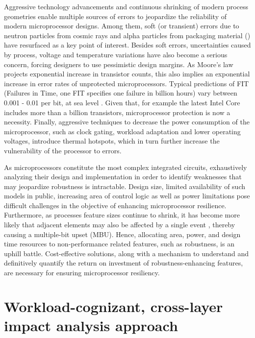 \documentclass[12pt]{yalephd}
\begin{document}
Aggressive technology advancements and continuous shrinking of modern process geometries enable multiple sources of errors to jeopardize the reliability of modern microprocessor designs. Among them, soft (or transient) errors due to neutron particles from cosmic rays and alpha particles from packaging material (\cite{normand1996single, constantinescu2003trends}) have resurfaced as a key point of interest. Besides soft errors, uncertainties caused by process, voltage and temperature variations have also become a serious concern, forcing designers to use pessimistic design margins. As Moore's law projects exponential increase in transistor counts, this also implies an exponential increase in error rates of unprotected microprocessors. Typical predictions of FIT (Failures in Time, one FIT specifies one failure in billion hours) vary between 0.001 - 0.01 per bit, at sea level \cite{normand1996single}. Given that, for example the latest Intel Core includes more than a billion transistors, microprocessor protection is now a necessity. Finally, aggressive techniques to decrease the power consumption of the microprocessor, such as clock gating, workload adaptation and lower operating voltages, introduce thermal hotspots, which in turn further increase the vulnerability of the processor to errors.

As microprocessors constitute the most complex integrated circuits, exhaustively analyzing their design and implementation in order to identify weaknesses that may jeopardize robustness is intractable. Design size, limited availability of such models in public, increasing area of control logic as well as power limitations pose difficult challenges in the objective of enhancing microprocessor resilience. Furthermore, as processes feature sizes continue to shrink, it has become more likely that adjacent elements may also be affected by a single event \cite{criswell1984single}, thereby causing a multiple-bit upset (MBU). Hence, allocating area, power, and design time resources to non-performance related features, such as robustness, is an uphill battle. Cost-effective solutions, along with a mechanism to understand and definitively quantify the return on investment of robustness-enhancing features, are necessary for ensuring microprocessor resiliency.

\section{Workload-cognizant, cross-layer impact analysis approach}
\end{document}
